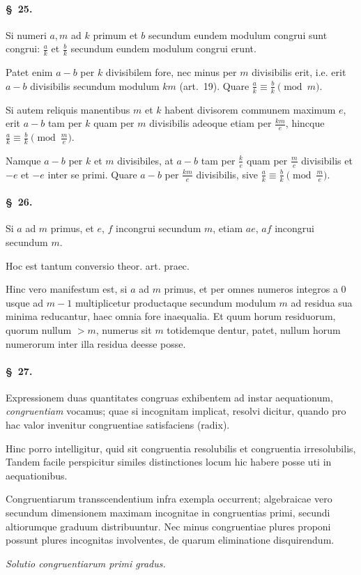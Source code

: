 \documentclass[12pt,a4paper]{article}
\theoremstyle{plain}
\theoremstyle{definition}
\theoremstyle{remark}
\newcommand{\art}[1]{\paragraph{\S\ #1.}}
\begin{document}
\art{25}
Si numeri $a, m$ ad $k$ primum et $b$ secundum eundem modulum congrui sunt congrui: $\frac{a}{k}$ et $\frac{b}{k}$ secundum eundem modulum congrui erunt.

Patet enim $a - b$ per $k$ divisibilem fore, nec minus per $m$ divisibilis erit, i.e. erit $a - b$ divisibilis secundum modulum $km$ (art.~19). Quare $\frac{a}{k} \equiv \frac{b}{k} \pmod{m}$.

Si autem reliquis manentibus $m$ et $k$ habent divisorem communem maximum $e$, erit $a - b$ tam per $k$ quam per $m$ divisibilis adeoque etiam per $\frac{km}{e}$, hincque $\frac{a}{k} \equiv \frac{b}{k} \pmod{\frac{m}{e}}$.

Namque $a - b$ per $k$ et $m$ divisibiles, at $a - b$ tam per $\frac{k}{e}$ quam per $\frac{m}{e}$ divisibilis et $-e$ et $-e$ inter se primi. Quare $a - b$ per $\frac{km}{e}$ divisibilis, sive $\frac{a}{k} \equiv \frac{b}{k} \pmod{\frac{m}{e}}$.

\art{26}
Si $a$ ad $m$ primus, et $e$, $f$ incongrui secundum $m$, etiam $ae$, $af$ incongrui secundum $m$.

Hoc est tantum conversio theor. art. praec.

Hinc vero manifestum est, si $a$ ad $m$ primus, et per omnes numeros integros a $0$ usque ad $m-1$ multiplicetur productaque secundum modulum $m$ ad residua sua minima reducantur, haec omnia fore inaequalia. Et quum horum residuorum, quorum nullum $> m$, numerus sit $m$ totidemque dentur, patet, nullum horum numerorum inter illa residua deesse posse.

\art{27}
Expressionem duas quantitates congruas exhibentem ad instar aequationum, \emph{congruentiam} vocamus; quae si incognitam implicat, resolvi dicitur, quando pro hac valor invenitur congruentiae satisfaciens (radix).

Hinc porro intelligitur, quid sit congruentia resolubilis et congruentia irresolubilis, Tandem facile perspicitur similes distinctiones locum hic habere posse uti in aequationibus.

Congruentiarum transscendentium infra exempla occurrent; algebraicae vero secundum dimensionem maximam incognitae in congruentias primi, secundi altiorumque graduum distribuuntur. Nec minus congruentiae plures proponi possunt plures incognitas involventes, de quarum eliminatione disquirendum.

\begin{center}
\textit{Solutio congruentiarum primi gradus.}
\end{center}
\end{document}
